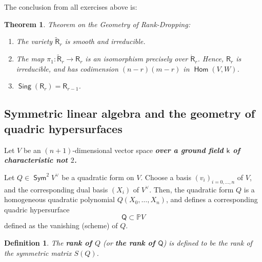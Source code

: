 \documentclass[11pt]{article}
\renewcommand{\P}{\mathbb{P}}
\renewcommand{\k}{\mathsf{k}}
\renewcommand{\to}{\longrightarrow}
\DeclareMathOperator{\Hom}{\mathsf{Hom}}
\DeclareMathOperator{\sing}{\mathsf{Sing}}
\DeclareMathOperator{\Sym}{\mathsf{Sym}}
\renewcommand{\k}{\mathsf{k}}
\renewcommand{\P}{\mathbb P}
\renewcommand{\to}{{\longrightarrow}}
\newtheorem{theorem}{Theorem}[section]
\newtheorem{definition}{Definition}[section]
\begin{document}
The conclusion from all exercises above is: 

\begin{theorem}
Theorem on the Geometry of Rank-Dropping: 
\begin{enumerate}
\item The variety \(\widetilde{\mathsf{R}}_{r}\) is smooth and irreducible.
\item The map \(\pi_{1}: \widetilde{\mathsf{R}}_{r} \to \mathsf{R}_{r}\) is an isomorphism precisely over  \(\mathring{\mathsf{R}}_{r}\).  Hence, \(\mathsf{R}_{r}\) is irreducible, and has codimension \((n-r)(m-r)\) in \(\Hom(V,W)\).
\item \(\sing(\mathsf{R}_{r}) = \mathsf{R}_{r-1}\).
\end{enumerate}
\end{theorem}

\subsection{Symmetric linear algebra and the geometry of quadric hypersurfaces}
\label{sec:org19a8581}

Let \(V\) be an \((n+1)\)-dimensional vector space \textbf{\emph{over a ground field \(\k\) of characteristic not \(2\).}}

Let \(Q \in \Sym^{2}V^{\vee}\) be a quadratic form on \(V\). Choose a basis \((v_{i})_{i=0, \ldots, n}\) of \(V\), and the corresponding dual basis \((X_{i})\) of \(V^{\vee}\).  Then, the quadratic form \(Q\) is a homogeneous quadratic polynomial \(Q(X_0, \ldots, X_n)\), and defines a corresponding quadric hypersurface $$\mathsf{Q} \subset \P V$$ defined as the vanishing (scheme) of \(Q\).


\begin{definition}
The \textbf{\emph{rank of \(Q\)}} (or \textbf{\emph{the rank of \(\mathsf{Q}\)}}) is defined to be the rank of the symmetric matrix \(S(Q)\).
\end{definition}
\end{document}
